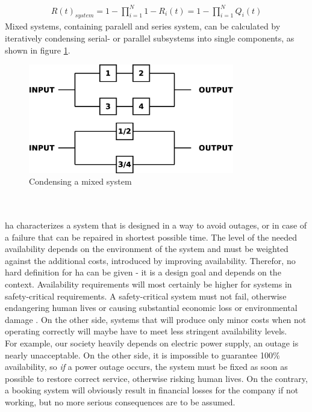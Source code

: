 \begin{align}\label{parallelSysEqu}
 R(t)_{system} = 1 - \prod_{i=1}^{N} 1- R_{i}(t) = 1 - \prod_{i=1}^{N} Q_{i}(t)
\end{align}
Mixed systems, containing paralell and series system, can be calculated by iteratively condensing serial- or parallel subsystems into single components,
as shown in figure \ref{fig:mixedSys}.
\begin{figure}
    \centering
    \includegraphics[width=0.8\textwidth]{figures/mixedSys.eps}
    \caption{Condensing a mixed system}
    \label{fig:mixedSys}
\end{figure}
\\
\\
\gls{ha} characterizes a system that is designed in a way to avoid outages, or in case of a failure that can be repaired in shortest possible time. 
The level of the needed availability depends on the environment of the system and must be weighted against the additional costs, introduced by improving availability.
Therefor, no hard definition for \gls{ha} can be given - it is a design goal and depends on the context. Availability requirements will most certainly be higher
for systems in safety-critical requirements. A safety-critical system must not fail, otherwise endangering human lives or 
causing substantial economic loss or environmental damage \cite{1007998}.
On the other side, systems that will produce only minor costs when not operating correctly
will maybe have to meet less stringent availability levels.
\\
For example, our society heavily depends on electric power supply, an outage
is nearly unacceptable. On the other side, it is impossible to guarantee 100\% availability, so \textit{if} a power outage occurs, the system must be fixed as soon as
possible to restore correct service, otherwise risking human lives. On the contrary, a booking system will obviously result in financial losses for the company 
if not working, but no more serious consequences are to be assumed.
